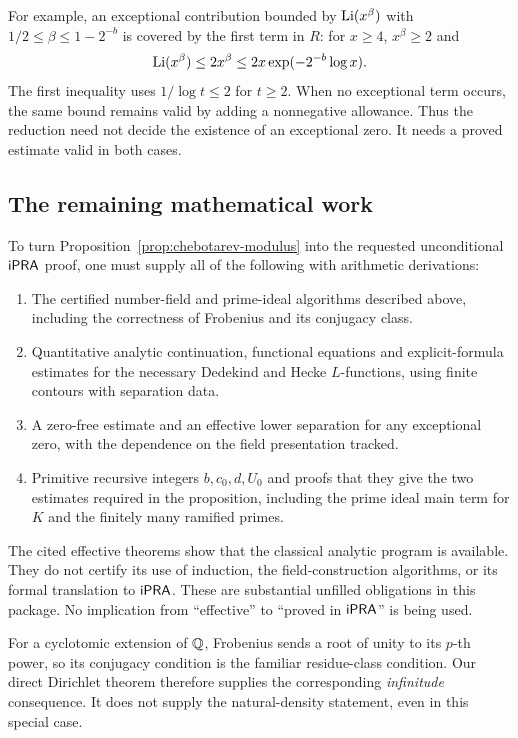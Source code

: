 For example, an exceptional contribution bounded by
$\operatorname{Li}(x^\beta)$ with $1/2\leq\beta\leq1-2^{-b}$ is covered by the first
term in $R$: for $x\geq4$, $x^\beta\geq2$ and
\[
 \operatorname{Li}(x^\beta)\leq 2x^\beta
 \leq2x\exp(-2^{-b}\log x).
\]
The first inequality uses $1/\log t\leq2$ for $t\geq2$.
When no exceptional term occurs, the same bound remains valid by adding
a nonnegative allowance. Thus the reduction need not decide the existence
of an exceptional zero. It needs a proved estimate valid in both cases.

\subsection{The remaining mathematical work}

To turn Proposition~\ref{prop:chebotarev-modulus} into the requested
unconditional $\mathsf{iPRA}$ proof, one must supply all of the following with
arithmetic derivations:
\begin{enumerate}
\item The certified number-field and prime-ideal algorithms described
above, including the correctness of Frobenius and its conjugacy class.
\item Quantitative analytic continuation, functional equations and
explicit-formula estimates for the necessary Dedekind and Hecke
$L$-functions, using finite contours with separation data.
\item A zero-free estimate and an effective lower separation for any
exceptional zero, with the dependence on the field presentation tracked.
\item Primitive recursive integers $b,c_0,d,U_0$ and proofs that they
give the two estimates required in the proposition, including the prime
ideal main term for $K$ and the finitely many ramified primes.
\end{enumerate}

The cited effective theorems show that the classical analytic program is
available. They do not certify its use of induction, the field-construction
algorithms, or its formal translation to $\mathsf{iPRA}$. These are substantial
unfilled obligations in this package. No implication from ``effective'' to
``proved in $\mathsf{iPRA}$'' is being used.

For a cyclotomic extension of $\mathbb Q$, Frobenius sends a root of unity to its
$p$-th power, so its conjugacy condition is the familiar residue-class
condition. Our direct Dirichlet theorem therefore supplies the corresponding
\emph{infinitude} consequence. It does not supply the natural-density
statement, even in this special case.
